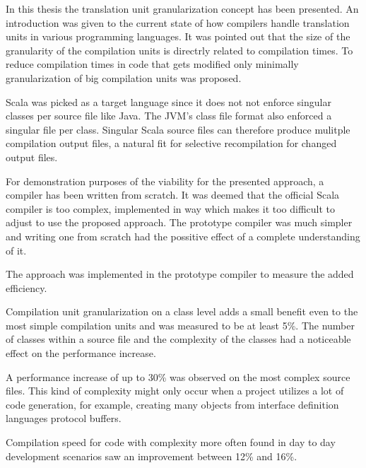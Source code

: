 \documentclass{VUMIFPSbakalaurinis}
\begin{document}

In this thesis the translation unit granularization concept has been presented.
An introduction was given to the current state of how compilers handle translation units in various programming languages.
It was pointed out that the size of the granularity of the compilation units is directrly related to compilation times.
To reduce compilation times in code that gets modified only minimally granularization of big compilation units was proposed.

Scala was picked as a target language since it does not not enforce singular classes per source file like Java.
The JVM's class file format also enforced a singular file per class.
Singular Scala source files can therefore produce mulitple compilation output files, a natural fit for selective recompilation for changed output files.

For demonstration purposes of the viability for the presented approach, a compiler has been written from scratch.
It was deemed that the official Scala compiler is too complex, implemented in way which makes it too difficult to adjust to use the proposed approach.
The prototype compiler was much simpler and writing one from scratch had the possitive effect of a complete understanding of it.

The approach was implemented in the prototype compiler to measure the added efficiency.



Compilation unit granularization on a class level adds a small benefit even to the most simple compilation units and was measured to be at least 5\%.
The number of classes within a source file and the complexity of the classes had a noticeable effect on the performance increase.

A performance increase of up to 30\% was observed on the most complex source files.
This kind of complexity might only occur when a project utilizes a lot of code generation, for example, creating many objects from interface definition languages protocol buffers.

Compilation speed for code with complexity more often found in day to day development scenarios saw an improvement between 12\% and 16\%.
\end{document}
